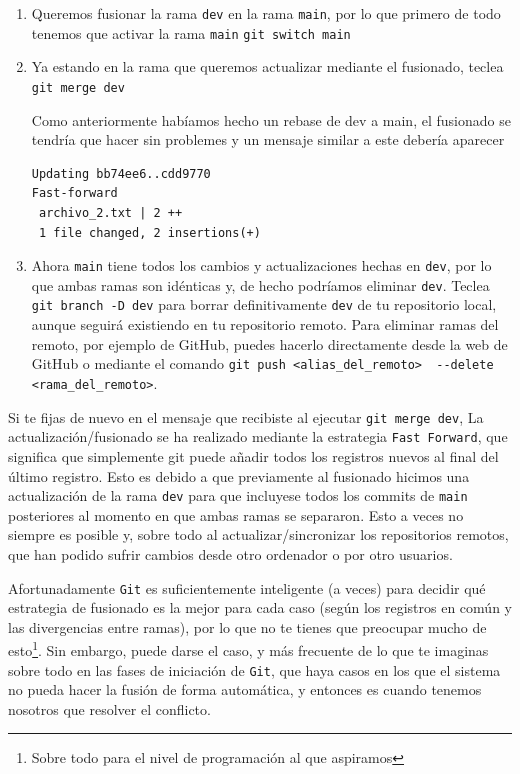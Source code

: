 \documentclass[a4paper,11pt]{report}
\newcommand{\cverb}{\Verb}
\begin{document}
    \begin{enumerate}
     \item Queremos fusionar la rama \verb+dev+ en la rama \verb+main+, por lo que primero de todo tenemos que activar la rama \verb+main+
     \cverb+git switch main+
     \item Ya estando en la rama que queremos actualizar mediante el fusionado, teclea
     \cverb+git merge dev+
     
     Como anteriormente habíamos hecho un rebase de dev a main, el fusionado se tendría que hacer sin problemes y un mensaje similar a este debería aparecer
     \begin{lstlisting}[style=custom]
Updating bb74ee6..cdd9770
Fast-forward
 archivo_2.txt | 2 ++
 1 file changed, 2 insertions(+)
     \end{lstlisting}
     
     \item Ahora \verb+main+ tiene todos los cambios y actualizaciones hechas en \verb+dev+, por lo que ambas ramas son idénticas y, de hecho podríamos eliminar \verb+dev+. Teclea
     \cverb+git branch -D dev+ para borrar definitivamente \verb+dev+ de tu repositorio local, aunque seguirá existiendo en tu repositorio remoto. Para eliminar ramas del remoto, por ejemplo de GitHub, puedes hacerlo directamente desde la web de GitHub o mediante el comando \cverb+git push <alias_del_remoto>  --delete <rama_del_remoto>+.

    \end{enumerate}
    
    Si te fijas de nuevo en el mensaje que recibiste al ejecutar \verb+git merge dev+, La actualización/fusionado se ha realizado mediante la estrategia \verb+Fast Forward+, que significa que simplemente git puede añadir todos los registros nuevos al final del último registro. Esto es debido a que previamente al fusionado hicimos una actualización de la rama \verb+dev+ para que incluyese todos los commits de \verb+main+ posteriores al momento en que ambas ramas se separaron. Esto a veces no siempre es posible y, sobre todo al actualizar/sincronizar los repositorios remotos, que han podido sufrir cambios desde otro ordenador o por otro usuarios.
    
    Afortunadamente \verb+Git+ es suficientemente inteligente (a veces) para decidir qué estrategia de fusionado es la mejor para cada caso (según los registros en común y las divergencias entre ramas), por lo que no te tienes que preocupar mucho de esto\footnote{Sobre todo para el nivel de programación al que aspiramos}. Sin embargo, puede darse el caso, y más frecuente de lo que te imaginas sobre todo en las fases de iniciación de \verb+Git+, que haya casos en los que el sistema no pueda hacer la fusión de forma automática, y entonces es cuando tenemos nosotros que resolver el conflicto.
  
\end{document}
